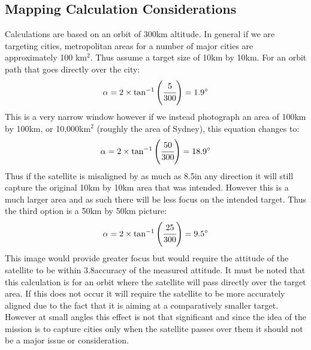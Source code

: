 \subsection{Mapping Calculation Considerations} \label{app:mapping}
Calculations are based on an orbit of 300km altitude. In general if we are targeting cities, metropolitan areas for a number of major cities are approximately 100 km$^2$.  Thus assume a target size of 10km by 10km.  For an orbit path that goes directly over the city:
\[
\alpha = 2\times \tan^{-1}\left(\cfrac{5}{300}\right) = 1.9\deg
\]
\noindent
This is a very narrow window however if we instead photograph an area of 100km by 100km, or 10,000km$^2$ (roughly the area of Sydney), this equation changes to:
\[
\alpha = 2\times \tan^{-1}\left(\cfrac{50}{300}\right) = 18.9\deg
\]
\noindent
Thus if the satellite is misaligned by as much as 8.5\deg in any direction it will still capture the original 10km by 10km area that was intended.  However this is a much larger area and as such there will be less focus on the intended target.  Thus the third option is a 50km by 50km picture:
\[
\alpha = 2\times \tan^{-1}\left(\cfrac{25}{300}\right) = 9.5\deg
\]
\noindent
This image would provide greater focus but would require the attitude of the satellite to be within 3.8\deg accuracy of the measured attitude. It must be noted that this calculation is for an orbit where the satellite will pass directly over the target area.  If this does not occur it will require the satellite to be more accurately aligned due to the fact that it is aiming at a comparatively smaller target.  However at small angles this effect is not that significant and since the idea of the mission is to capture cities only when the satellite passes over them it should not be a major issue or consideration.

